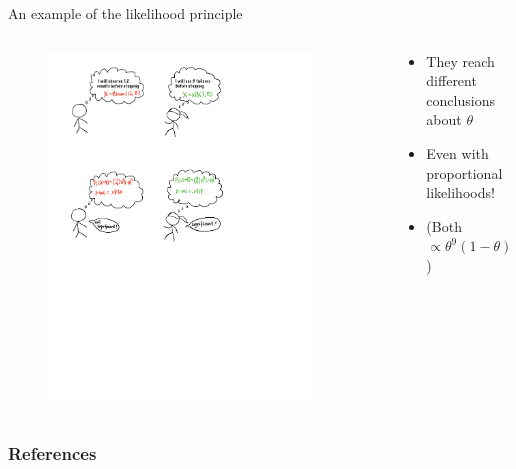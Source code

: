 \documentclass[11pt
,fragile=singleslide
,xcolor=dvipsnames
]{beamer}
\begin{document}
\begin{frame}{An example of the likelihood principle}
	\begin{columns}
		\begin{column}{0.6\textwidth}
			\begin{figure}
				\centering
				\includegraphics[width=\textwidth, trim=0 2in 2.5in 0.5in, clip]{figures/Likelihood_principle_example_1.pdf}
			\end{figure}
		\end{column}
	~
		\begin{column}{0.39\textwidth}
		\begin{itemize}
			\item They reach \textcolor{Cerulean}{different} conclusions about $\theta$
			\item Even with \textcolor{Cerulean}{proportional} likelihoods!
			\item (Both $\propto \theta^9 (1-\theta)^3$)
		\end{itemize}
		\vspace{2.3in}
		\end{column}
		\end{columns}
\end{frame}


	
	
	\begin{frame}[allowframebreaks]
		\frametitle{References}
		
		
	\end{frame}
	
	
\end{document}
